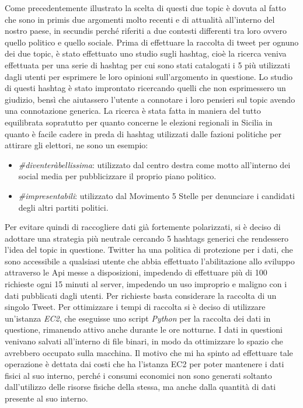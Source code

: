 Come precedentemente illustrato la scelta di questi due topic è dovuta al fatto che sono in primis due argomenti molto recenti e di attualità all'interno del nostro paese, in secundis perché riferiti a due contesti differenti tra loro ovvero quello politico e quello sociale.
Prima di effettuare la raccolta di tweet per ognuno dei due topic, è stato effettuato uno studio sugli hashtag, cioè la ricerca veniva effettuata per una serie di hashtag per cui sono stati catalogati i 5 più utilizzati dagli utenti per esprimere le loro opinioni sull'argomento in questione.
Lo studio di questi hashtag è stato improntato ricercando quelli che non esprimessero un giudizio, bensì che aiutassero l'utente a connotare i loro pensieri sul topic avendo una connotazione generica.
La ricerca è stata fatta in maniera del tutto equilibrata sopratutto per quanto concerne le elezioni regionali in Sicilia in quanto è facile cadere in preda di hashtag utilizzati dalle fazioni politiche per attirare gli elettori, ne sono un esempio:
\begin{itemize}
\item \textit{\#diventeràbellissima}: utilizzato dal centro destra come motto all'interno dei social media per pubblicizzare il proprio piano politico.
\item \textit{\#impresentabili}: utilizzato dal Movimento 5 Stelle per denunciare i candidati degli altri partiti politici.
\end{itemize} 
Per evitare quindi di raccogliere dati già fortemente polarizzati, si è deciso di adottare una strategia più neutrale cercando 5 hashtags generici che rendessero l'idea del topic in questione.
Twitter ha una politica di protezione per i dati, che sono accessibile a qualsiasi utente che abbia effettuato l'abilitazione allo sviluppo attraverso le Api messe a disposizioni, impedendo di effettuare più di 100 richieste ogni 15 minuti al server, impedendo un uso improprio e maligno con i dati pubblicati dagli utenti. Per richieste basta considerare la raccolta di un singolo Tweet.
Per ottimizzare i tempi di raccolta si è deciso di utilizzare un'istanza \textit{EC2}, che eseguisse uno script \textit{Python} per la raccolta dei dati in questione, rimanendo attivo anche durante le ore notturne.
I dati in questioni venivano salvati all'interno di file binari, in modo da ottimizzare lo spazio che avrebbero occupato sulla macchina.
Il motivo che mi ha spinto ad effettuare tale operazione è dettata dai costi che ha l'istanza EC2 per poter mantenere i dati fisici al suo interno, perché i consumi economici non sono generati soltanto dall'utilizzo delle risorse fisiche della stessa, ma anche dalla quantità di dati presente al suo interno.
 

